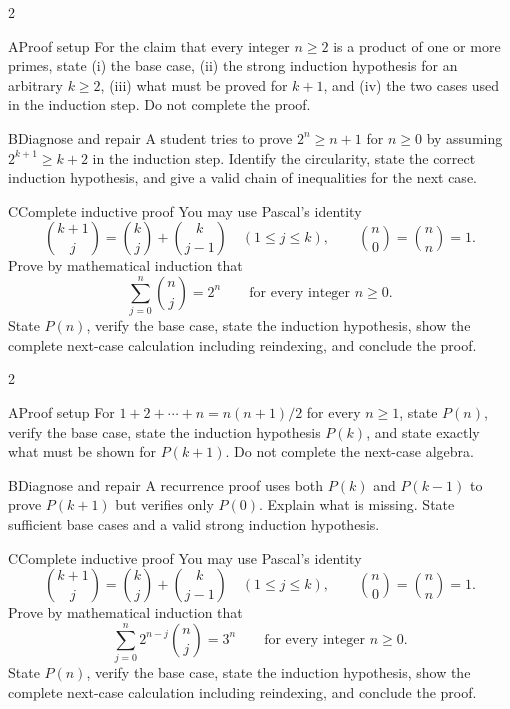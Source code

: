 \documentclass[9pt]{extarticle}
\begin{document}
\begin{multicols}{2}
\begin{CompactCoreProblem}{A}{Proof setup}
For the claim that every integer $n\ge2$ is a product of one or more primes, state (i) the base case, (ii) the strong induction hypothesis for an arbitrary $k\ge2$, (iii) what must be proved for $k+1$, and (iv) the two cases used in the induction step. Do not complete the proof.
\end{CompactCoreProblem}
\begin{CompactCoreProblem}{B}{Diagnose and repair}
A student tries to prove $2^n\ge n+1$ for $n\ge0$ by assuming $2^{k+1}\ge k+2$ in the induction step. Identify the circularity, state the correct induction hypothesis, and give a valid chain of inequalities for the next case.
\end{CompactCoreProblem}
\end{multicols}
\begin{CompactCoreProblem}{C}{Complete inductive proof}
You may use Pascal's identity
\[
\binom{k+1}{j}=\binom{k}{j}+\binom{k}{j-1}
\quad(1\le j\le k),\qquad
\binom{n}{0}=\binom{n}{n}=1.
\]
Prove by mathematical induction that
\[
\sum_{j=0}^{n}\binom{n}{j}=2^n\qquad\text{for every integer }n\ge0.
\]
State $P(n)$, verify the base case, state the induction hypothesis, show the complete next-case calculation including reindexing, and conclude the proof.
\end{CompactCoreProblem}
\CoreWorkArea
\FormBreak
{}
\begin{multicols}{2}
\begin{CompactCoreProblem}{A}{Proof setup}
For $1+2+\cdots+n=n(n+1)/2$ for every $n\ge1$, state $P(n)$, verify the base case, state the induction hypothesis $P(k)$, and state exactly what must be shown for $P(k+1)$. Do not complete the next-case algebra.
\end{CompactCoreProblem}
\begin{CompactCoreProblem}{B}{Diagnose and repair}
A recurrence proof uses both $P(k)$ and $P(k-1)$ to prove $P(k+1)$ but verifies only $P(0)$. Explain what is missing. State sufficient base cases and a valid strong induction hypothesis.
\end{CompactCoreProblem}
\end{multicols}
\begin{CompactCoreProblem}{C}{Complete inductive proof}
You may use Pascal's identity
\[
\binom{k+1}{j}=\binom{k}{j}+\binom{k}{j-1}
\quad(1\le j\le k),\qquad
\binom{n}{0}=\binom{n}{n}=1.
\]
Prove by mathematical induction that
\[
\sum_{j=0}^{n} 2^{n-j}\binom{n}{j}=3^n\qquad\text{for every integer }n\ge0.
\]
State $P(n)$, verify the base case, state the induction hypothesis, show the complete next-case calculation including reindexing, and conclude the proof.
\end{CompactCoreProblem}
\end{document}
